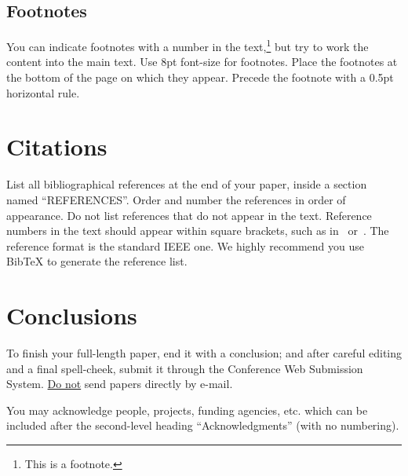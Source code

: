 \documentclass{article}
\begin{document}
\subsection{Footnotes}
You can indicate footnotes with a number in the text,\footnote{This is a footnote.}
but try to work the content into the main text.
Use 8pt font-size for footnotes.
Place the footnotes at the bottom of the page
on which they appear.
Precede the footnote with a 0.5pt horizontal rule.

\section{Citations}
List all bibliographical references at the end of your paper,
inside a section named ``REFERENCES''.
Order and number the references in order of appearance.
Do not list references that do not appear in the text.
Reference numbers in the text should appear within square brackets, such as
in~\cite{Someone:00} or~\cite{Someone:00,Someone:04,Someone:09}.
The reference format is the standard IEEE one.
We highly recommend you use BibTeX
to generate the reference list.

\section{Conclusions}
To finish your full-length paper, end it with a conclusion;
and after careful editing and a final spell-cheek,
submit it through the Conference Web Submission System.
\underline{Do not} send papers directly by e-mail.
%
\begin{acknowledgments}
You may acknowledge people, projects,
funding agencies, etc.
which can be included after the second-level heading
``Acknowledgments'' (with no numbering).
\end{acknowledgments}


\end{document}
